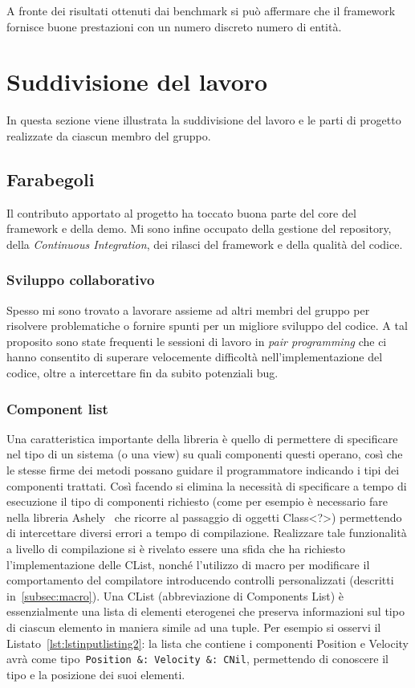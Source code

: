 A fronte dei risultati ottenuti dai benchmark si può affermare che il framework fornisce buone prestazioni con un numero
discreto numero di entità.

\section{Suddivisione del lavoro}\label{sec:suddivisione-del-lavoro}
In questa sezione viene illustrata la suddivisione del lavoro e le parti di progetto realizzate da ciascun membro del
gruppo.

\subsection{Farabegoli}\label{subsec:farabegoli}
Il contributo apportato al progetto ha toccato buona parte del core del framework e della demo.
Mi sono infine occupato della gestione del repository, della \textit{Continuous Integration}, dei rilasci del framework
e della qualità del codice.

\subsubsection{Sviluppo collaborativo}
Spesso mi sono trovato a lavorare assieme ad altri membri del gruppo per risolvere problematiche o fornire spunti per
un migliore sviluppo del codice.
A tal proposito sono state frequenti le sessioni di lavoro in \textit{pair programming} che ci hanno consentito di
superare velocemente difficoltà nell'implementazione del codice, oltre a intercettare fin da subito potenziali bug.

\subsubsection{Component list}
Una caratteristica importante della libreria è quello di permettere di specificare nel tipo di un sistema (o una view)
su quali componenti questi operano, così che le stesse firme dei metodi possano guidare il programmatore indicando i
tipi dei componenti trattati.
Così facendo si elimina la necessità di specificare a tempo di esecuzione il tipo di componenti richiesto (come per
esempio è necessario fare nella libreria Ashely~\cite{ashley} che ricorre al passaggio di oggetti Class<?>)
permettendo di intercettare diversi errori a tempo di compilazione.
Realizzare tale funzionalità a livello di compilazione si è rivelato essere una sfida che ha richiesto l’implementazione
delle CList, nonché l’utilizzo di macro per modificare il comportamento del compilatore introducendo controlli
personalizzati (descritti in~\ref{subsec:macro}).
Una CList (abbreviazione di Components List) è essenzialmente una lista di elementi eterogenei che preserva informazioni
sul tipo di ciascun elemento in maniera simile ad una tuple.
Per esempio si osservi il Listato~\ref{lst:lstinputlisting2}: la lista che contiene
i componenti Position e Velocity avrà come tipo~\texttt{Position~\&:~Velocity~\&:~CNil}, permettendo di conoscere il
tipo e la posizione dei suoi elementi.

